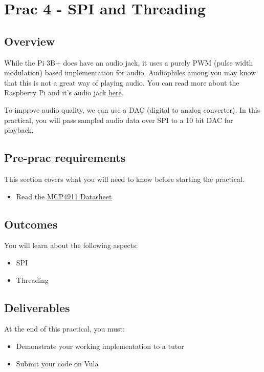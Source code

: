 \newpage
\section{Prac 4 - SPI and Threading}
\subsection{Overview}
While the Pi 3B+ does have an audio jack, it uses a purely PWM (pulse width modulation) based implementation for audio. Audiophiles among you may know that this is not a great way of playing audio. You can read more about the Raspberry Pi and it's audio jack \href{https://hackaday.com/2018/07/13/behind-the-pin-how-the-raspberry-pi-gets-its-audio/}{here}.

To improve audio quality, we can use a DAC (digital to analog converter). In this practical, you will pass sampled audio data over SPI to a 10 bit DAC for playback. 

\subsection{Pre-prac requirements}
This section covers what you will need to know before starting the practical.
\begin{itemize}
    \item Read the \href{http://ww1.microchip.com/downloads/en/DeviceDoc/22248a.pdf}{MCP4911 Datasheet}
\end{itemize}

\subsection{Outcomes}
You will learn about the following aspects:
\begin{itemize}
    \item SPI
    \item Threading
\end{itemize}

\subsection{Deliverables}
At the end of this practical, you must:
\begin{itemize}
    \item Demonstrate your working implementation to a tutor
    \item Submit your code on Vula
\end{itemize}

